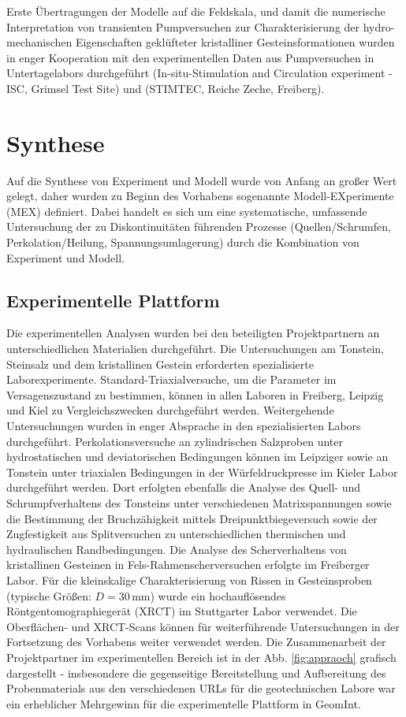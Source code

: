 Erste Übertragungen der Modelle auf die Feldskala, und damit die numerische Interpretation von transienten Pumpversuchen zur Charakterisierung der hydro-mechanischen Eigenschaften geklüfteter kristalliner Gesteinsformationen wurden in enger Kooperation mit den experimentellen Daten aus Pumpversuchen 
in Untertagelabors durchgeführt \cite{steeb-2020b} (In-situ-Stimulation and Circulation experiment - ISC, Grimsel Test Site) und \cite{steeb-2020c} (STIMTEC, Reiche Zeche, Freiberg).

\section*{Synthese}
\label{sec:syn}

Auf die Synthese von Experiment und Modell wurde von Anfang an großer Wert gelegt, daher wurden zu Beginn des Vorhabens sogenannte Modell-EXperimente (MEX) definiert.
Dabei handelt es sich um eine systematische, umfassende Untersuchung der zu Diskontinuitäten führenden Prozesse (Quellen/Schrumfen, Perkolation/Heilung, Spannungsumlagerung) durch die Kombination von Experiment und Modell.

\subsection*{Experimentelle Plattform}
\label{sec:exp}

Die experimentellen Analysen wurden bei den beteiligten Projektpartnern an unterschiedlichen Materialien durchgeführt. Die Untersuchungen am Tonstein, Steinsalz und dem kristallinen Gestein erforderten spezialisierte Laborexperimente. Standard-Triaxialversuche, um die Parameter im Versagenszustand zu bestimmen, können in allen Laboren in Freiberg, Leipzig und Kiel zu Vergleichszwecken durchgeführt werden.
Weitergehende Untersuchungen wurden in enger Absprache in den spezialisierten Labors durchgeführt.
%
Perkolationsversuche an zylindrischen Salzproben unter hydrostatischen und deviatorischen Bedingungen können im Leipziger sowie an Tonstein unter triaxialen Bedingungen in der Würfeldruckpresse im Kieler Labor durchgeführt werden. Dort erfolgten ebenfalls die Analyse des Quell- und Schrumpfverhaltens des Tonsteins unter verschiedenen Matrixspannungen sowie die Bestimmung der Bruchzähigkeit mittels Dreipunktbiegeversuch sowie der Zugfestigkeit aus Splitversuchen zu unterschiedlichen thermischen und hydraulischen Randbedingungen.
%
Die Analyse des Scherverhaltens von kristallinen Gesteinen in Fels-Rahmenscherversuchen erfolgte im Freiberger Labor. Für die kleinskalige Charakterisierung von Rissen in Gesteinsproben (typische Größen: $D=30$\,mm) wurde ein hochauflösendes Röntgentomographiegerät (XRCT) im Stuttgarter Labor verwendet. 
Die Oberflächen- und XRCT-Scans können für weiterführende  Untersuchungen in der Fortsetzung des Vorhabens weiter verwendet werden.
%
Die Zusammenarbeit der Projektpartner im experimentellen Bereich ist in der Abb. \ref{fig:appraoch} grafisch dargestellt - insbesondere die gegenseitige Bereitstellung und Aufbereitung des Probenmaterials aus den verschiedenen URLs für die geotechnischen Labore war ein erheblicher Mehrgewinn für die experimentelle Plattform in GeomInt.

